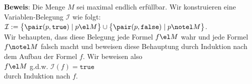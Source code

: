 \noindent
\textbf{Beweis}:
Die Menge $M$ sei maximal endlich erfüllbar.  Wir konstruieren eine Variablen-Belegung
$\mathcal{I}$ wie folgt:
\\[0.2cm]
\hspace*{1.3cm}
$\mathcal{I} := \bigl\{ \pair(p, \mathtt{true})  \mid p \el M \bigr\} \cup
                \bigl\{ \pair(p, \mathtt{false}) \mid p \notel M \bigr\}$.
\\[0.2cm]
Wir behaupten, dass diese Belegung  jede Formel $f\el M$ wahr und jede Formel $f \notel M$
falsch macht und beweisen diese
Behauptung durch Induktion nach dem Aufbau der Formel $f$. Wir beweisen also
\\[-0.2cm]
\hspace*{1.3cm}
$f \el M$ \quad g.d.w. \quad $\mathcal{I}(f) = \mathtt{true}$
\\[0.2cm]
durch Induktion nach $f$.
